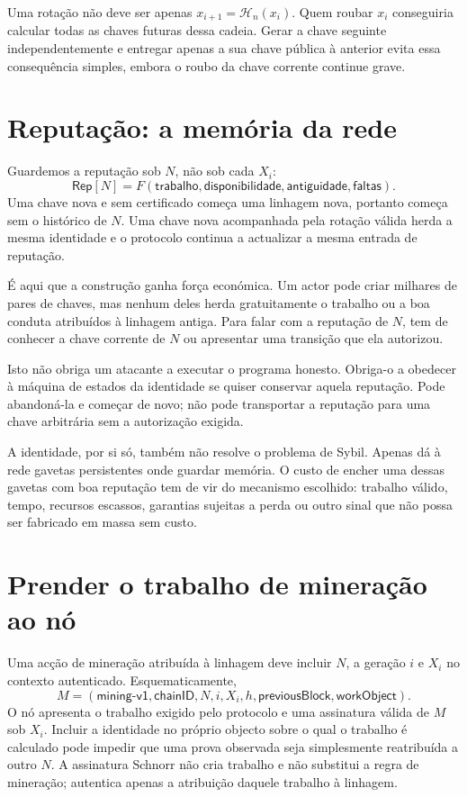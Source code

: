 Uma rotação não deve ser apenas \(x_{i+1}=\mathcal H_n(x_i)\). Quem roubar
\(x_i\) conseguiria calcular todas as chaves futuras dessa cadeia. Gerar a
chave seguinte independentemente e entregar apenas a sua chave pública à
anterior evita essa consequência simples, embora o roubo da chave corrente
continue grave.

\section{Reputação: a memória da rede}

Guardemos a reputação sob \(N\), não sob cada \(X_i\):
\[
    \mathsf{Rep}[N]
       =F(\mathsf{trabalho},\mathsf{disponibilidade},
           \mathsf{antiguidade},\mathsf{faltas}).
\]
Uma chave nova e sem certificado começa uma linhagem nova, portanto começa sem
o histórico de \(N\). Uma chave nova acompanhada pela rotação válida herda a
mesma identidade e o protocolo continua a actualizar a mesma entrada de
reputação.

É aqui que a construção ganha força económica. Um actor pode criar milhares
de pares de chaves, mas nenhum deles herda gratuitamente o trabalho ou a boa
conduta atribuídos à linhagem antiga. Para falar com a reputação de \(N\), tem
de conhecer a chave corrente de \(N\) ou apresentar uma transição que ela
autorizou.

Isto não obriga um atacante a executar o programa honesto. Obriga-o a obedecer
à máquina de estados da identidade se quiser conservar aquela reputação. Pode
abandoná-la e começar de novo; não pode transportar a reputação para uma chave
arbitrária sem a autorização exigida.

A identidade, por si só, também não resolve o problema de Sybil. Apenas dá à
rede gavetas persistentes onde guardar memória. O custo de encher uma dessas
gavetas com boa reputação tem de vir do mecanismo escolhido: trabalho válido,
tempo, recursos escassos, garantias sujeitas a perda ou outro sinal que não
possa ser fabricado em massa sem custo.

\section{Prender o trabalho de mineração ao nó}

Uma acção de mineração atribuída à linhagem deve incluir \(N\), a geração
\(i\) e \(X_i\) no contexto autenticado. Esquematicamente,
\[
 M=(\mathsf{mining\mbox{-}v1},\mathsf{chainID},N,i,X_i,h,
       \mathsf{previousBlock},\mathsf{workObject}).
\]
O nó apresenta o trabalho exigido pelo protocolo e uma assinatura válida de
\(M\) sob \(X_i\). Incluir a identidade no próprio objecto sobre o qual o
trabalho é calculado pode impedir que uma prova observada seja simplesmente
reatribuída a outro \(N\). A assinatura Schnorr não cria trabalho e não
substitui a regra de mineração; autentica apenas a atribuição daquele trabalho
à linhagem.

